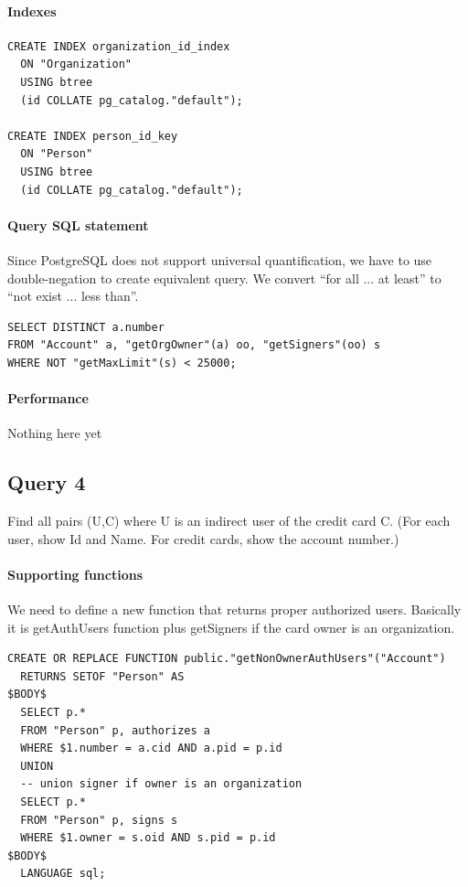 \documentclass[11pt]{article}
\begin{document}
\paragraph{Indexes}
\begin{verbatim}
CREATE INDEX organization_id_index
  ON "Organization"
  USING btree
  (id COLLATE pg_catalog."default");

CREATE INDEX person_id_key
  ON "Person"
  USING btree
  (id COLLATE pg_catalog."default");
\end{verbatim}

\paragraph{Query SQL statement} Since PostgreSQL does not support universal quantification, we have to use double-negation to create equivalent query. We convert ``for all ... at least'' to ``not exist ... less than''.
\begin{verbatim}
SELECT DISTINCT a.number
FROM "Account" a, "getOrgOwner"(a) oo, "getSigners"(oo) s
WHERE NOT "getMaxLimit"(s) < 25000;
\end{verbatim}

\paragraph{Performance} Nothing here yet

\subsection{Query 4}
Find all pairs (U,C) where U is an indirect user of the credit card C. (For each user, show Id and Name. For credit cards, show the account number.)

\paragraph{Supporting functions} We need to define a new function that returns proper authorized users. Basically it is getAuthUsers function plus getSigners if the card owner is an organization.
\begin{verbatim}
CREATE OR REPLACE FUNCTION public."getNonOwnerAuthUsers"("Account")
  RETURNS SETOF "Person" AS
$BODY$
  SELECT p.*
  FROM "Person" p, authorizes a
  WHERE $1.number = a.cid AND a.pid = p.id
  UNION
  -- union signer if owner is an organization
  SELECT p.*
  FROM "Person" p, signs s
  WHERE $1.owner = s.oid AND s.pid = p.id
$BODY$
  LANGUAGE sql;
\end{verbatim}
\end{document}

